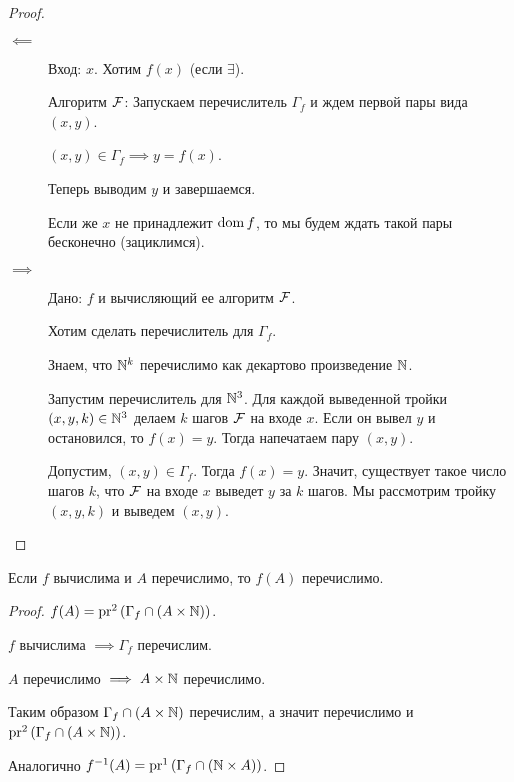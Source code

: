 \begin{proof}~
    \begin{description}
        \item[$\impliedby$] Вход: $x$. Хотим $f(x)$ (если $\exists$).

            Алгоритм $\mathcal{F}$: Запускаем перечислитель $\Gamma_f$ и ждем первой пары вида $(x, y)$.

            $(x, y) \in \Gamma_f \implies y = f(x)$.

            Теперь выводим $y$ и завершаемся.

            Если же $x$ не принадлежит $\operatorname{\mathop{\mathrm{dom}}} f$, то мы будем ждать такой пары бесконечно (зациклимся).
        \item[$\implies$] Дано: $f$ и вычисляющий ее алгоритм $\mathcal{F}$.

            Хотим сделать перечислитель для $\Gamma_f$.

            Знаем, что $\mathbb{N}^k$ перечислимо как декартово произведение $\mathbb{N}$.

            Запустим перечислитель для $\mathbb{N}^3$.
            Для каждой выведенной тройки $(x, y, k) \in \mathbb{N}^3$ делаем $k$ шагов $\mathcal{F}$ на входе $x$.
            Если он вывел $y$ и остановился, то $f(x) = y$.
            Тогда напечатаем пару $(x, y)$.

            Допустим, $(x, y) \in \Gamma_f$.
            Тогда $f(x) = y$. Значит, существует такое число шагов $k$, что $\mathcal{F}$ на входе $x$ выведет $y$ за $k$ шагов.
            Мы рассмотрим тройку $(x, y, k)$ и выведем $(x, y)$.
            \qedhere
    \end{description}
\end{proof}

\begin{corollary}
    Если $f$ вычислима и $A$ перечислимо, то $f(A)$ перечислимо.
\end{corollary}

\begin{proof}
    $f(A) = \operatorname{\mathop{\mathrm{pr}}}^2 \left(\Gamma_f \cap \left(A \times \mathbb{N}\right)\right)$.

    $f$ вычислима $\implies \Gamma_f$ перечислим.

    $A$ перечислимо $\implies A \times \mathbb{N}$ перечислимо.

    Таким образом $\Gamma_f \cap (A \times \mathbb{N})$ перечислим, а значит перечислимо и $\operatorname{\mathop{\mathrm{pr}}}^2 \left(\Gamma_f \cap \left(A \times \mathbb{N}\right)\right)$.

    Аналогично $f^{-1}(A) = \operatorname{\mathop{\mathrm{pr}}}^1 \left(\Gamma_f \cap \left(\mathbb{N} \times A\right)\right)$.
\end{proof}

